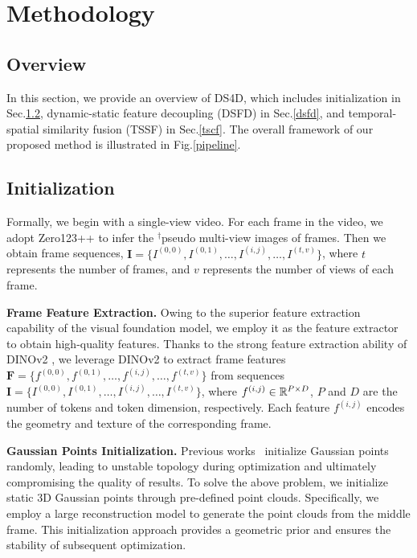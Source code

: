 \section{Methodology}
\subsection{Overview}
In this section, we provide an overview of DS4D, which includes initialization in Sec.\ref{initial}, dynamic-static feature decoupling (DSFD) in Sec.\ref{dsfd}, and temporal-spatial similarity fusion (TSSF) in Sec.\ref{tscf}. The overall framework of our proposed method is illustrated in Fig.\ref{pipeline}.

\subsection{Initialization} \label{initial}

Formally, we begin with a single-view video. For each frame in the video, we adopt Zero123++ \cite{shi2023zero123++} to infer the $^{\dag}$pseudo multi-view images of frames. Then we obtain frame sequences, $\textbf{I}=\{I^{(0,0)}, I^{(0,1)},\dots,I^{(i,j)},\dots,I^{(t,v)}\}$, where $t$ represents the number of frames, and $v$ represents the number of views of each frame.


\textbf{Frame Feature Extraction.} Owing to the superior feature extraction capability of the visual foundation model, we employ it as the feature extractor to obtain high-quality features. Thanks to the strong feature extraction ability of DINOv2 \cite{oquab2023dinov2}, we leverage DINOv2 to extract frame features $\textbf{F}=\{f^{(0,0)}, f^{(0,1)},\dots,f^{(i,j)},\dots,f^{(t,v)}\}$ from sequences $\textbf{I}=\{I^{(0,0)}, I^{(0,1)},\dots,I^{(i,j)},\dots,I^{(t,v)}\}$, where $f^{(i,j)}\in \mathbb{R}^{P\times D}$, $P$ and $D$ are the number of tokens and token dimension, respectively. Each feature $f^{(i,j)}$ encodes the geometry and texture of the corresponding frame.
 


\renewcommand{\thefootnote}{\fnsymbol{footnote}}

\textbf{Gaussian Points Initialization.} Previous works~\cite{zeng2024stag4d,wu2024sc4d} initialize Gaussian points randomly, leading to unstable topology during optimization and ultimately compromising the quality of results. To solve the above problem, we initialize static 3D Gaussian points through pre-defined point clouds. Specifically, we employ a large reconstruction model \cite{xu2024instantmesh} to generate the point clouds from the middle frame. This initialization approach provides a geometric prior and ensures the stability of subsequent optimization. 



